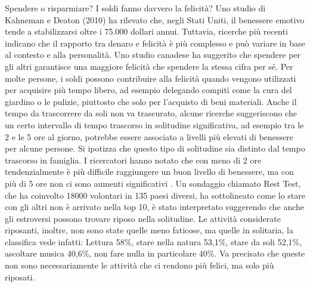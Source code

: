 \documentclass[12pt]{book} %
\begin{document}
\begin{mdframed}[linewidth=1pt]
Spendere o risparmiare? I soldi fanno davvero la felicità? Uno studio di Kahneman e Deaton (2010) ha rilevato che, negli Stati Uniti, il benessere emotivo tende a stabilizzarsi oltre i 75.000 dollari annui. Tuttavia, ricerche più recenti indicano che il rapporto tra denaro e felicità è più complesso e può variare in base al contesto e alla personalità. Uno studio canadese ha suggerito che spendere per gli altri
garantisce una maggiore felicità che spendere la stessa cifra per sé. 
Per molte persone, i soldi possono contribuire alla felicità quando vengono utilizzati per acquisire più tempo libero, ad esempio delegando compiti come la cura del giardino o le pulizie, piuttosto che solo per l'acquisto di beni materiali. Anche il tempo da trascorrere da soli non va
trascurato, alcune ricerche suggeriscono che un certo intervallo di tempo trascorso in solitudine significativa, ad esempio tra le 2 e le 5 ore al giorno, potrebbe essere associato a livelli più elevati di benessere per alcune persone. Si ipotizza che questo tipo di solitudine sia distinto dal tempo trascorso in famiglia. I ricercatori hanno notato che con meno di 2 ore tendenzialmente è più difficile raggiungere un buon livello di benessere, ma con più di 5 ore non ci sono aumenti significativi
  .
Un sondaggio chiamato Rest Test, che ha coinvolto 18000 volontari in 135 paesi diversi, ha sottolineato come lo stare con gli altri non è arrivato nella top 10, è stato interpretato suggerendo che anche gli estroversi possono trovare riposo nella solitudine. Le attività considerate riposanti, inoltre, non sono state quelle meno faticose, ma quelle in solitaria, la classifica vede infatti: Lettura 58\%, stare nella natura 53,1\%, stare da soli 52,1\%, ascoltare musica 40,6\%, non fare nulla in particolare 40\%. Va precisato che queste non sono necessariamente le attività che ci rendono più felici, ma solo più riposati.


\end{mdframed}
\end{document}
